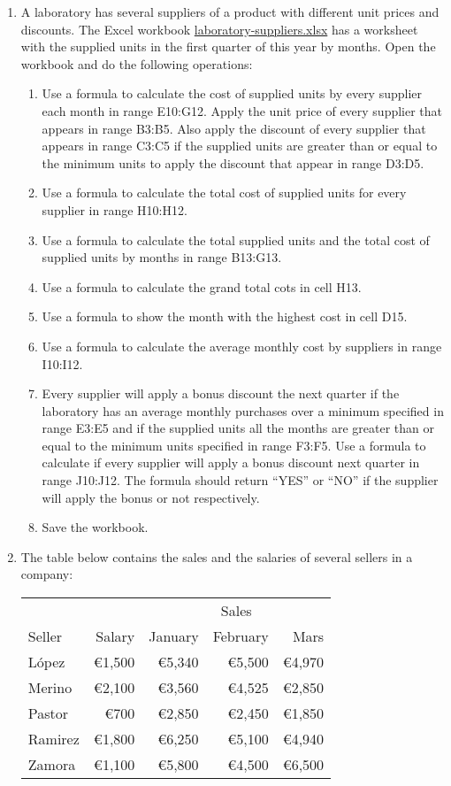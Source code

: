 \begin{enumerate}[leftmargin=*,resume]
\item \label{ex-laboratory-suppliers}A laboratory has several suppliers of a product with different unit prices and
discounts.
The Excel workbook
\href{http://aprendeconalf.es/office/excel/exercises/formulas/laboratory-suppliers.xlsx}{\textsf{laboratory-suppliers.xlsx}}
has a worksheet with the supplied units in the first quarter of this year by months. 
Open the workbook and do the following operations: 
\begin{enumerate}
\item Use a formula to calculate the cost of supplied units by every supplier each month in range E10:G12.  
Apply the unit price of every supplier that appears in range B3:B5.
Also apply the discount of every supplier that appears in range C3:C5 if the supplied units are greater than or equal to
the minimum units to apply the discount that appear in range D3:D5. 
\item Use a formula to calculate the total cost of supplied units for every supplier in range H10:H12. 
\item Use a formula to calculate the total supplied units and the total cost of supplied units by months in range
B13:G13.
\item Use a formula to calculate the grand total cots in cell H13. 
\item Use a formula to show the month with the highest cost in cell D15. 
\item Use a formula to calculate the average monthly cost by suppliers in range I10:I12. 
\item Every supplier will apply a bonus discount the next quarter if the laboratory has an average monthly purchases
over a minimum specified in range E3:E5 and if the supplied units all the months are greater than or equal to the
minimum units specified in range F3:F5.
Use a formula to calculate if every supplier will apply a bonus discount next quarter in range J10:J12.
The formula should return ``YES'' or ``NO'' if the supplier will apply the bonus or not respectively. 
\item Save the workbook.   
\end{enumerate} 


\item \label{ex-salary-sellers}The table below contains the sales and the salaries of several sellers in a company:
\begin{center}
\begin{tabular}{lrrrr}
\toprule
& & \multicolumn{3}{c}{Sales}\\
\cline{3-5}
Seller & Salary & January & February & Mars \\
\midrule
López & €1,500 & €5,340 & €5,500 & €4,970\\
Merino & €2,100 & €3,560 & €4,525 & €2,850\\
Pastor & €700  & €2,850 & €2,450 & €1,850\\
Ramirez & €1,800 & €6,250 & €5,100 & €4,940\\
Zamora & €1,100 & €5,800 & €4,500 & €6,500\\
\bottomrule
\end{tabular}
\end{center}


\end{enumerate}
